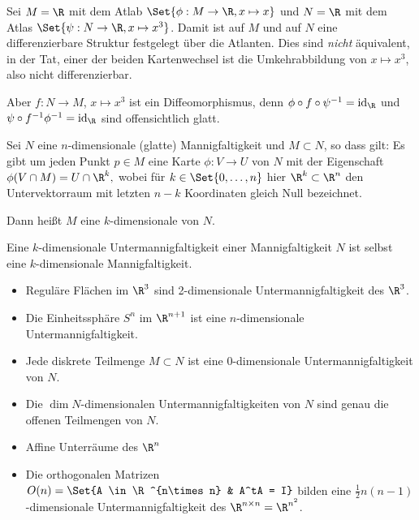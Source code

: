 \begin{ex}
    Sei $M = \R$ mit dem Atlab $\Set{\phi: M \to \R, x \mapsto x}$ und $N = \R$ mit dem Atlas $\Set{\psi: N \to \R, x \mapsto x^3}$.
    Damit ist auf $M$ und auf $N$ eine differenzierbare Struktur festgelegt über die Atlanten.
    Dies sind \emph{nicht} äquivalent, in der Tat, einer der beiden Kartenwechsel ist die Umkehrabbildung von $x \mapsto x^3$, also nicht differenzierbar.

    Aber $f: N \to M$, $x \mapsto x^3$ ist ein Diffeomorphismus, denn $\phi \circ f \circ \psi^{-1} = \id_\R$ und $\psi \circ f^{-1} \phi^{-1} = \id_\R$ sind offensichtlich glatt.
\end{ex}

\begin{df} \label{2.3}
    Sei $N$ eine $n$-dimensionale (glatte) Mannigfaltigkeit und $M \subset N$,
    so dass gilt: Es gibt um jeden Punkt $p \in M$ eine Karte $\phi: V \to U$ von $N$ mit der
    Eigenschaft
    \begin{math}
        \phi(V \cap M) = U \cap \R^k,
    \end{math}
    wobei für $k \in \Set{0, \dotsc, n}$ hier $\R^k \subset \R^n$ den Untervektorraum mit letzten $n-k$ Koordinaten gleich Null bezeichnet.

    Dann heißt $M$ eine $k$-dimensionale  von $N$.
    \begin{nt*}
        Eine $k$-dimensionale Untermannigfaltigkeit einer Mannigfaltigkeit $N$ ist selbst eine $k$-dimensionale Mannigfaltigkeit.
    \end{nt*}
\end{df}

\begin{ex*}
    \begin{itemize}
        \item
            Reguläre Flächen im $\R^3$ sind 2-dimensionale Untermannigfaltigkeit des $\R^3$.
        \item
            Die Einheitssphäre $S^n$ im $\R^{n+1}$ ist eine $n$-dimensionale Untermannigfaltigkeit.
        \item
            Jede diskrete Teilmenge $M \subset N$ ist eine $0$-dimensionale Untermannigfaltigkeit von $N$.
        \item
            Die $\dim N$-dimensionalen Untermannigfaltigkeiten von $N$ sind genau die offenen Teilmengen von $N$.
        \item
            Affine Unterräume des $\R^n$
        \item
            Die orthogonalen Matrizen
            \begin{math}
                O(n) = \Set{A \in \R^{n\times n} & A^tA = I}
            \end{math}
            bilden eine $\frac{1}{2}n(n-1)$-dimensionale Untermannigfaltigkeit des $\R^{n\times n} = \R^{n^2}$.
    \end{itemize}
\end{ex*}

